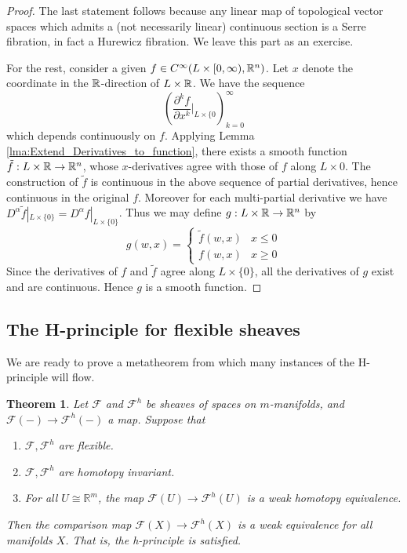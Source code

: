 \documentclass{article}
\newtheorem{theorem}{Theorem}[section]
\newtheorem{proposed work}[theorem]{Proposed Work}
\begin{document}
\begin{proof}
	The last statement follows because any linear map of topological vector spaces which admits a (not necessarily linear) continuous section is a Serre fibration, in fact a Hurewicz fibration. We leave this part as an exercise.  
	
	For the rest, consider a given $f \in C^\infty(L \times [0,\infty), \mathbb R^n)$. Let $x$ denote the coordinate in the $\mathbb R$-direction of $L \times \mathbb R$. We have the sequence
	\begin{equation*}
		\left( \frac{\partial^k f}{\partial x^k}|_{L \times \{0}  \right)_{k=0}^\infty
	\end{equation*}
	which depends continuously on $f$. Applying Lemma \ref{lma:Extend_Derivatives_to_function}, there exists a smooth function $\tilde{f}: L \times \mathbb R \to \mathbb R^n$, whose $x$-derivatives agree with those of $f$ along $L \times {0}$. The construction of $\tilde{f}$ is continuous in the above sequence of partial derivatives, hence continuous in the original $f$. Moreover for each multi-partial derivative we have $D^\alpha \tilde{f}|_{L \times \{0\}} = D^\alpha f|_{L \times \{0\}}$. Thus we may define $g:L \times \mathbb R \to \mathbb R^n$ by
	\begin{equation*}
		g(w,x) = \begin{cases}
			\tilde{f} (w,x) & x \leq 0 \\
			f(w,x) & x \geq 0
		\end{cases}
	\end{equation*}
Since the derivatives of $f$ and $\tilde{f}$ agree along $L \times \{0\}$, all the derivatives of $g$ exist and are continuous. Hence $g$ is a smooth function.
\end{proof}

\subsection{The H-principle for flexible sheaves}

We are ready to prove a metatheorem from which many instances of the H-principle will flow.

\begin{theorem}\label{thm:flexible-h-princ}
Let $\mathcal{F}$ and $\mathcal{F}^h$ be sheaves of spaces on $m$-manifolds, and $\mathcal F(-) \to \mathcal F^h(-)$ a map. Suppose that

\begin{enumerate}
\item $\mathcal F, \mathcal F^h$ are flexible.
\item $\mathcal F, \mathcal F^h$ are homotopy invariant.
\item For all $U \cong \mathbb R^m$, the map $\mathcal F(U) \to \mathcal F^h(U)$ is a weak homotopy equivalence.
\end{enumerate}

Then the comparison map $\mathcal F(X) \to \mathcal F^h(X)$ is a weak equivalence for all manifolds $X$. That is, the h-principle is satisfied.
\end{theorem}
\end{document}

